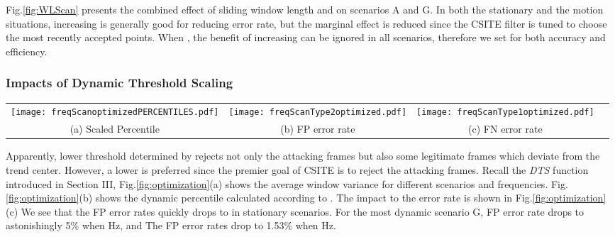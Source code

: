 \documentclass[conference]{IEEEtran}
\begin{document}
Fig.\ref{fig:WLScan} presents the combined effect of sliding window length  and  on scenarios A and G. In both the stationary and the motion situations, increasing  is generally good for reducing error rate, but the marginal effect is reduced since the CSITE filter is tuned to choose the most recently accepted points. When , the benefit of increasing  can be ignored in all scenarios, therefore we set  for both accuracy and efficiency.







\subsubsection{Impacts of Dynamic Threshold Scaling}


\begin{figure*}[!ht]
\begin{center}
\begin{tabular}{cccc}
\hspace{-0.2in}
\texttt{[image: freqScanoptimizedPERCENTILES.pdf]}  & \hspace{-0.25in}
\texttt{[image: freqScanType2optimized.pdf]}  & \hspace{-0.25in}
\texttt{[image: freqScanType1optimized.pdf]}  \\
(a) Scaled Percentile  &(b) FP error rate &(c) FN error rate
\end{tabular}
\end{center}
\caption{(a) shows the calculated percentile  according to . (b) and (c) present the corresponding FP and FN error rates using the percentile  shown in (a).}

\label{fig:optimization}
\end{figure*}

Apparently, lower threshold  determined by  rejects not only the attacking frames but also some legitimate frames which deviate from the trend center. However, a lower  is preferred since the premier goal of CSITE is to reject the attacking frames. Recall the \textit{DTS} function introduced in Section III, Fig.\ref{fig:optimization}(a) shows the average window variance  for different scenarios and frequencies. Fig.\ref{fig:optimization}(b) shows the dynamic percentile  calculated according to . The impact to the error rate is shown in Fig.\ref{fig:optimization}(c) We see that the FP error rates quickly drops to  in stationary scenarios. For the most dynamic scenario G, FP error rate drops to astonishingly 5\% when Hz, and The FP error rates drop to 1.53\% when Hz.
\end{document}
